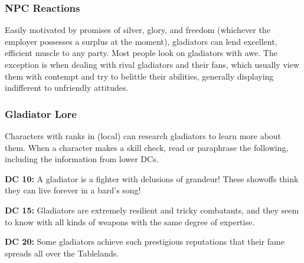 \subsubsection{NPC Reactions}
Easily motivated by promises of silver, glory, and freedom (whichever the employer possesses a surplus at the moment), gladiators can lend excellent, efficient muscle to any party. Most people look on gladiators with awe. The exception is when dealing with rival gladiators and their fans, which usually view them with contempt and try to belittle their abilities, generally displaying indifferent to unfriendly attitudes.

\subsubsection{Gladiator Lore}
Characters with ranks in  (local) can research gladiators to learn more about them. When a character makes a skill check, read or paraphrase the following, including the information from lower DCs.

\textbf{DC 10:} A gladiator is a fighter with delusions of grandeur! These showoffs think they can live forever in a bard's song!

\textbf{DC 15:} Gladiators are extremely resilient and tricky combatants, and they seem to know with all kinds of weapons with the same degree of expertise.

\textbf{DC 20:} Some gladiators achieve such prestigious reputations that their fame spreads all over the Tablelands.
